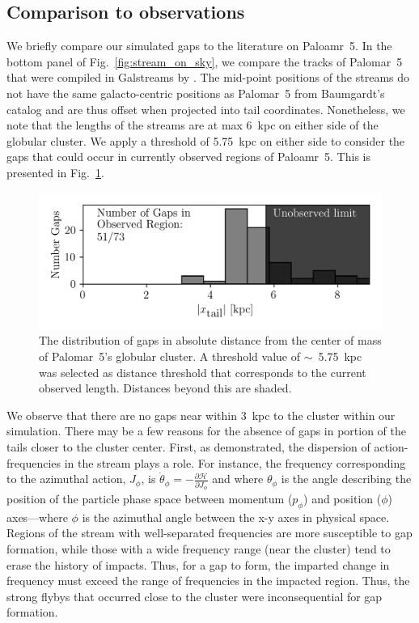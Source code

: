 \documentclass{aa}
\begin{document}
  \subsection{Comparison to observations}

    We briefly compare our simulated gaps to the literature on Paloamr~5. In the bottom panel of Fig.~\ref{fig:stream_on_sky}, we compare the tracks of Palomar~5 that were compiled in Galstreams by \citet{2023MNRAS.520.5225M}. The mid-point positions of the streams do not have the same galacto-centric positions as Palomar~5 from  Baumgardt's catalog and are thus offset when projected into tail coordinates. Nonetheless, we note that the lengths of the streams are at max 6~kpc on either side of the globular cluster. We apply a threshold of 5.75~kpc on either side to consider the gaps that could occur in currently observed regions of Paloamr~5. This is presented in Fig.~\ref{fig:GapsWithinSight}.
      \begin{figure}
        \centering
        \includegraphics[width=\linewidth]{GapWithinSight.png}
        \caption{The distribution of gaps in absolute distance from the center of mass of Palomar~5's globular cluster. A threshold value of $\sim$~5.75~kpc was selected as distance threshold that corresponds to the current observed length. Distances beyond this are shaded. }
        \label{fig:GapsWithinSight}
      \end{figure}    
    
    We observe that there are no gaps near within 3~kpc to the cluster within our simulation. There may be a few reasons for the absence of gaps in portion of the tails closer to the cluster center. First, as \citet{2016MNRAS.457.3817S} demonstrated, the dispersion of action-frequencies in the stream plays a role. For instance, the frequency corresponding to the azimuthal action, $J_\phi$, is $\dot\theta_\phi = - \frac{\mathcal{\partial H}}{\partial J_\phi}$ and where $\theta_\phi$ is the angle describing the position of the particle phase space between momentum ($p_\phi$) and position ($\phi$) axes---where $\phi$ is the azimuthal angle between the x-y axes in physical space. Regions of the stream with well-separated frequencies are more susceptible to gap formation, while those with a wide frequency range (near the cluster) tend to erase the history of impacts. Thus, for a gap to form, the imparted change in frequency must exceed the range of frequencies in the impacted region. Thus, the strong flybys that occurred close to the cluster were inconsequential for gap formation. 
    
\end{document}
